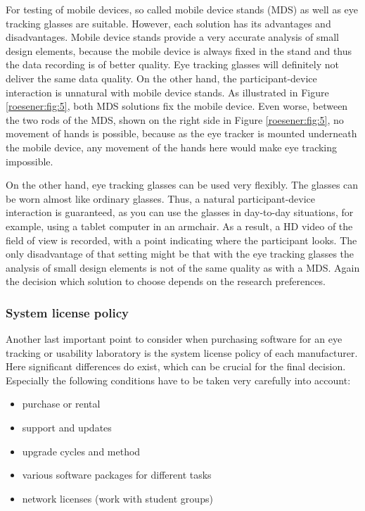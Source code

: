 \documentclass[output=paper]{langsci/langscibook}
\begin{document}
For testing of mobile devices, so called mobile device stands (MDS) as well as eye tracking glasses are suitable. However, each solution has its advantages and disadvantages. Mobile device stands provide a very accurate analysis of small design elements, because the mobile device is always fixed in the stand and thus the data recording is of better quality. Eye tracking glasses will definitely not deliver the same data quality. On the other hand, the participant-device interaction is unnatural with mobile device stands. As illustrated in Figure \ref{roesener:fig:5}, both MDS solutions fix the mobile device. Even worse, between the two rods of the MDS, shown on the right side in Figure \ref{roesener:fig:5}, no movement of hands is possible, because as the eye tracker is mounted underneath the mobile device, any movement of the hands here would make eye tracking impossible.


On the other hand, eye tracking glasses can be used very flexibly. The glasses can be worn almost like ordinary glasses. Thus, a natural participant-device interaction is guaranteed, as you can use the glasses in day-to-day situations, for example, using a tablet computer in an armchair. As a result, a HD video of the field of view is recorded, with a point indicating where the participant looks. The only disadvantage of that setting might be that with the eye tracking glasses the analysis of small design elements is not of the same quality as with a MDS. Again the decision which solution to choose depends on the research preferences.


\subsubsection{System license policy}

Another last important point to consider when purchasing software for an eye tracking or usability laboratory is the system license policy of each manufacturer. Here significant differences do exist, which can be crucial for the final decision. Especially the following conditions have to be taken very carefully into account:

\begin{itemize}
\item purchase or rental 
\item support and updates 
\item upgrade cycles and method 
\item various software packages for different tasks 
\item network licenses (work with student groups)
\end{itemize}
\end{document}
